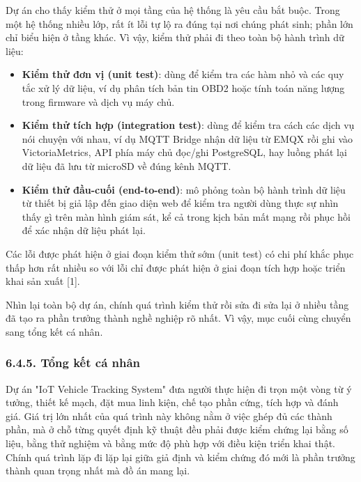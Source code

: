 \documentclass[a4paper]{extarticle}
\providecommand{\tightlist}{%
  \setlength{\itemsep}{0pt}\setlength{\parskip}{0pt}}
\begin{document}
Dự án cho thấy kiểm thử ở mọi tầng của hệ thống là yêu cầu bắt buộc.
Trong một hệ thống nhiều lớp, rất ít lỗi tự lộ ra đúng tại nơi chúng
phát sinh; phần lớn chỉ biểu hiện ở tầng khác. Vì vậy, kiểm thử phải đi
theo toàn bộ hành trình dữ liệu:

\begin{itemize}
\tightlist
\item
  \textbf{Kiểm thử đơn vị (unit test)}: dùng để kiểm tra các hàm nhỏ và
  các quy tắc xử lý dữ liệu, ví dụ phân tích bản tin OBD2 hoặc tính toán
  năng lượng trong firmware và dịch vụ máy chủ.
\item
  \textbf{Kiểm thử tích hợp (integration test)}: dùng để kiểm tra cách
  các dịch vụ nói chuyện với nhau, ví dụ MQTT Bridge nhận dữ liệu từ
  EMQX rồi ghi vào VictoriaMetrics, API phía máy chủ đọc/ghi PostgreSQL, hay
  luồng phát lại dữ liệu đã lưu từ microSD về đúng kênh MQTT.
\item
  \textbf{Kiểm thử đầu-cuối (end-to-end)}: mô phỏng toàn bộ hành trình
  dữ liệu từ thiết bị giả lập đến giao diện web để kiểm tra người dùng
  thực sự nhìn thấy gì trên màn hình giám sát, kể cả trong kịch bản mất mạng rồi
  phục hồi để xác nhận dữ liệu phát lại.
\end{itemize}

Các lỗi được phát hiện ở giai đoạn kiểm thử sớm (unit test) có chi phí
khắc phục thấp hơn rất nhiều so với lỗi chỉ được phát hiện ở giai đoạn
tích hợp hoặc triển khai sản xuất {[}1{]}.

Nhìn lại toàn bộ dự án, chính quá trình kiểm thử rồi sửa đi sửa lại ở
nhiều tầng đã tạo ra phần trưởng thành nghề nghiệp rõ nhất. Vì vậy, mục
cuối cùng chuyển sang tổng kết cá nhân.

\subsubsection{6.4.5. Tổng kết cá
nhân}\label{645-tux1ed5ng-kux1ebft-cuxe1-nhuxe2n}

Dự án "IoT Vehicle Tracking System" đưa người thực hiện đi trọn một vòng
từ ý tưởng, thiết kế mạch, đặt mua linh kiện, chế tạo phần cứng, tích
hợp và đánh giá. Giá trị lớn nhất của quá trình này không nằm ở việc
ghép đủ các thành phần, mà ở chỗ từng quyết định kỹ thuật đều phải được
kiểm chứng lại bằng số liệu, bằng thử nghiệm và bằng mức độ phù hợp với
điều kiện triển khai thật. Chính quá trình lặp đi lặp lại giữa giả định
và kiểm chứng đó mới là phần trưởng thành quan trọng nhất mà đồ án mang
lại.
\end{document}
